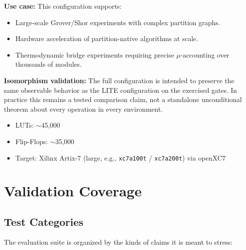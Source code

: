 \textbf{Use case:} This configuration supports:
\begin{itemize}
    \item Large-scale Grover/Shor experiments with complex partition graphs.
    \item Hardware acceleration of partition-native algorithms at scale.
    \item Thermodynamic bridge experiments requiring precise $\mu$-accounting over thousands of modules.
\end{itemize}

\textbf{Isomorphism validation:} The full configuration is intended to preserve the same observable behavior as the LITE configuration on the exercised gates. In practice this remains a tested comparison claim, not a standalone unconditional theorem about every operation in every environment.

\begin{itemize}
    \item LUTs: $\sim$45{,}000
    \item Flip-Flops: $\sim$35{,}000
    \item Target: Xilinx Artix-7 (large, e.g., \texttt{xc7a100t} / \texttt{xc7a200t}) via openXC7
\end{itemize}

\section{Validation Coverage}

\subsection{Test Categories}

The evaluation suite is organized by the kinds of claims it is meant to stress:

